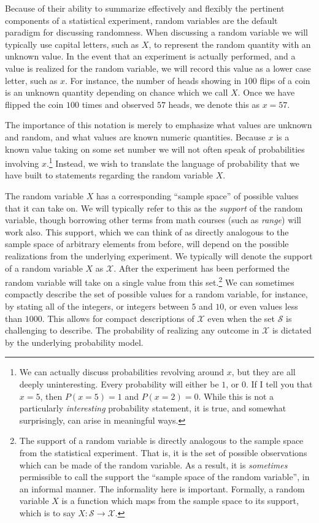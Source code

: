 \documentclass[
  letterpaper,
  DIV=11,
  numbers=noendperiod]{scrreprt}
\theoremstyle{definition}
\theoremstyle{definition}
\theoremstyle{definition}
\theoremstyle{remark}
\begin{document}
Because of their ability to summarize effectively and flexibly the
pertinent components of a statistical experiment, random variables are
the default paradigm for discussing randomness. When discussing a random
variable we will typically use capital letters, such as \(X\), to
represent the random quantity with an unknown value. In the event that
an experiment is actually performed, and a value is realized for the
random variable, we will record this value as a lower case letter, such
as \(x\). For instance, the number of heads showing in \(100\) flips of
a coin is an unknown quantity depending on chance which we call \(X\).
Once we have flipped the coin \(100\) times and observed \(57\) heads,
we denote this as \(x=57\).

The importance of this notation is merely to emphasize what values are
unknown and random, and what values are known numeric quantities.
Because \(x\) is a known value taking on some set number we will not
often speak of probabilities involving \(x\).\footnote{We can actually
  discuss probabilities revolving around \(x\), but they are all deeply
  uninteresting. Every probability will either be \(1\), or \(0\). If I
  tell you that \(x = 5\), then \(P(x=5) = 1\) and \(P(x = 2) = 0\).
  While this is not a particularly \emph{interesting} probability
  statement, it is true, and somewhat surprisingly, can arise in
  meaningful ways.} Instead, we wish to translate the language of
probability that we have built to statements regarding the random
variable \(X\).

The random variable \(X\) has a corresponding ``sample space'' of
possible values that it can take on. We will typically refer to this as
the \emph{support} of the random variable, though borrowing other terms
from math courses (such as \emph{range}) will work also. This support,
which we can think of as directly analogous to the sample space of
arbitrary elements from before, will depend on the possible realizations
from the underlying experiment. We typically will denote the support of
a random variable \(X\) as \(\mathcal{X}\). After the experiment has
been performed the random variable will take on a single value from this
set.\footnote{The support of a random variable is directly analogous to
  the sample space from the statistical experiment. That is, it is the
  set of possible observations which can be made of the random variable.
  As a result, it is \emph{sometimes} permissible to call the support
  the ``sample space of the random variable'', in an informal manner.
  The informality here is important. Formally, a random variable \(X\)
  is a function which maps from the sample space to its support, which
  is to say \(X \colon \mathcal{S}\to\mathcal{X}\).} We can sometimes
compactly describe the set of possible values for a random variable, for
instance, by stating all of the integers, or integers between \(5\) and
\(10\), or even values less than \(1000\). This allows for compact
descriptions of \(\mathcal{X}\) even when the set \(\mathcal{S}\) is
challenging to describe. The probability of realizing any outcome in
\(\mathcal{X}\) is dictated by the underlying probability model.
\end{document}
